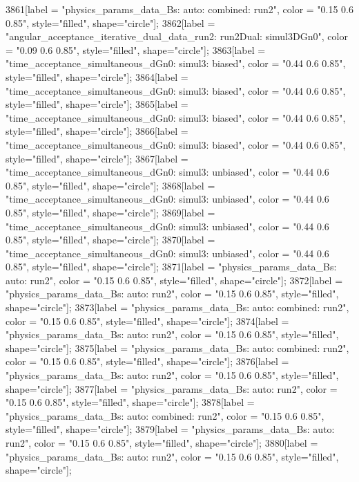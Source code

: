 {	3861[label = "physics_params_data_Bs\nfit: auto\ntrigger: combined\nyear: run2", color = "0.15 0.6 0.85", style="filled", shape="circle"];
	3862[label = "angular_acceptance_iterative_dual_data_run2\nangacc: run2Dual\ntimeacc: simul3DGn0", color = "0.09 0.6 0.85", style="filled", shape="circle"];
	3863[label = "time_acceptance_simultaneous_dGn0\ntimeacc: simul3\ntrigger: biased", color = "0.44 0.6 0.85", style="filled", shape="circle"];
	3864[label = "time_acceptance_simultaneous_dGn0\ntimeacc: simul3\ntrigger: biased", color = "0.44 0.6 0.85", style="filled", shape="circle"];
	3865[label = "time_acceptance_simultaneous_dGn0\ntimeacc: simul3\ntrigger: biased", color = "0.44 0.6 0.85", style="filled", shape="circle"];
	3866[label = "time_acceptance_simultaneous_dGn0\ntimeacc: simul3\ntrigger: biased", color = "0.44 0.6 0.85", style="filled", shape="circle"];
	3867[label = "time_acceptance_simultaneous_dGn0\ntimeacc: simul3\ntrigger: unbiased", color = "0.44 0.6 0.85", style="filled", shape="circle"];
	3868[label = "time_acceptance_simultaneous_dGn0\ntimeacc: simul3\ntrigger: unbiased", color = "0.44 0.6 0.85", style="filled", shape="circle"];
	3869[label = "time_acceptance_simultaneous_dGn0\ntimeacc: simul3\ntrigger: unbiased", color = "0.44 0.6 0.85", style="filled", shape="circle"];
	3870[label = "time_acceptance_simultaneous_dGn0\ntimeacc: simul3\ntrigger: unbiased", color = "0.44 0.6 0.85", style="filled", shape="circle"];
	3871[label = "physics_params_data_Bs\nfit: auto\nyear: run2", color = "0.15 0.6 0.85", style="filled", shape="circle"];
	3872[label = "physics_params_data_Bs\nfit: auto\nyear: run2", color = "0.15 0.6 0.85", style="filled", shape="circle"];
	3873[label = "physics_params_data_Bs\nfit: auto\ntrigger: combined\nyear: run2", color = "0.15 0.6 0.85", style="filled", shape="circle"];
	3874[label = "physics_params_data_Bs\nfit: auto\nyear: run2", color = "0.15 0.6 0.85", style="filled", shape="circle"];
	3875[label = "physics_params_data_Bs\nfit: auto\ntrigger: combined\nyear: run2", color = "0.15 0.6 0.85", style="filled", shape="circle"];
	3876[label = "physics_params_data_Bs\nfit: auto\nyear: run2", color = "0.15 0.6 0.85", style="filled", shape="circle"];
	3877[label = "physics_params_data_Bs\nfit: auto\nyear: run2", color = "0.15 0.6 0.85", style="filled", shape="circle"];
	3878[label = "physics_params_data_Bs\nfit: auto\ntrigger: combined\nyear: run2", color = "0.15 0.6 0.85", style="filled", shape="circle"];
	3879[label = "physics_params_data_Bs\nfit: auto\nyear: run2", color = "0.15 0.6 0.85", style="filled", shape="circle"];
	3880[label = "physics_params_data_Bs\nfit: auto\nyear: run2", color = "0.15 0.6 0.85", style="filled", shape="circle"];
}
